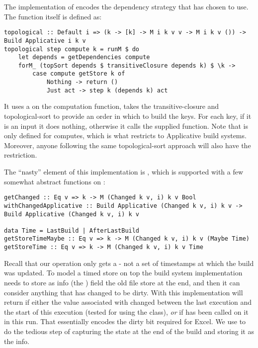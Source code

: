 The implementation of  encodes the dependency strategy that \Make has chosen to use. The function itself is defined as:

\begin{verbatim}
topological :: Default i => (k -> [k] -> M i k v v -> M i k v ()) -> Build Applicative i k v
topological step compute k = runM $ do
    let depends = getDependencies compute
    forM_ (topSort depends $ transitiveClosure depends k) $ \k ->
        case compute getStore k of
            Nothing -> return ()
            Just act -> step k (depends k) act
\end{verbatim}

It uses a  on the computation function, takes the transitive-closure and topological-sort to provide an order in which to build the keys. For each key, if it is an input it does nothing, otherwise it calls the supplied  function. Note that  is only defined for  computes, which is what restricts \Make to Applicative build systems. Moreover, anyone following the same topological-sort approach will also have the  restriction.

The ``nasty'' element of this implementation is , which is supported with a few somewhat abstract functions on :

\begin{verbatim}
getChanged :: Eq v => k -> M (Changed k v, i) k v Bool
withChangedApplicative :: Build Applicative (Changed k v, i) k v -> Build Applicative (Changed k v, i) k v

data Time = LastBuild | AfterLastBuild
getStoreTimeMaybe :: Eq v => k -> M (Changed k v, i) k v (Maybe Time)
getStoreTime :: Eq v => k -> M (Changed k v, i) k v Time
\end{verbatim}

Recall that our  operation only gets a  - not a set of timestamps at which the build was updated. To model a timed store on top the build system implementation needs to store as info (the ) field the old file store at the end, and then it can consider anything that has changed to be dirty. With this implementation  will return  if either the value associated with  changed between the last execution and the start of this execution (tested for using the  class), \textit{or} if  has been called on it in this run. That essentially encodes the dirty bit required for Excel. We use  to do the tedious step of capturing the state at the end of the build and storing it as the info.

